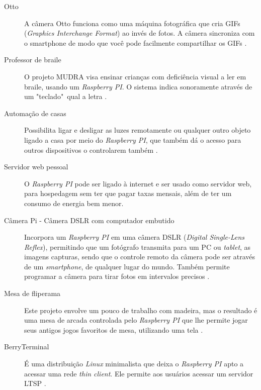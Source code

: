 \documentclass[
	12pt,				%
	openright,			%
	twoside,			%
	a4paper,			%
	chapter=TITLE,		%
	english,			%
	brazil				%
	]{abntex2}
\begin{document}
\begin{description}

\item[Otto]A câmera Otto funciona como uma máquina fotográfica que cria GIFs (\textit{Graphics Interchange Format}) ao invés de fotos. A câmera sincroniza com o smartphone de modo que você pode facilmente compartilhar os GIFs \cite{otto}.
  
\item[Professor de braile] O projeto MUDRA visa ensinar crianças com deficiência visual a ler em braile, usando um \textit{Raspberry PI}. O sistema indica sonoramente através de um "teclado"\ qual a  letra \cite{mudra}.

\item[Automação de casas] Possibilita ligar e desligar as luzes remotamente ou qualquer outro objeto ligado a casa por meio do \textit{Raspberry PI}, que também dá o acesso para outros dispositivos o controlarem também \cite{AplicacaoRaspberry}.

\item[Servidor web pessoal] O \textit{Raspberry PI} pode ser ligado à internet e ser usado como servidor web, para hospedagem sem ter que pagar taxas mensais, além de ter um consumo de energia bem menor.


\item[Câmera Pi - Câmera  DSLR com computador embutido] Incorpora um \textit{Raspberry PI} em uma câmera DSLR (\textit{Digital Single-Lens Reflex}), permitindo que um fotógrafo transmita para um PC ou \textit{tablet}, as imagens capturas, sendo que o controle remoto da câmera pode ser através de um \textit{smartphone}, de qualquer lugar do mundo. Também permite programar a câmera para tirar fotos em intervalos precisos \cite{cameraPI}.

\item[Mesa de fliperama] Este projeto envolve um pouco de trabalho com madeira, mas o resultado é uma mesa de arcada controlada pelo \textit{Raspberry PI} que lhe permite jogar seus antigos jogos favoritos de mesa, utilizando uma tela \cite{AplicacaoRaspberry}.

\item[BerryTerminal] É uma distribuição \textit{Linux} minimalista que deixa o \textit{Raspberry PI} apto a acessar uma rede \textit{thin client}. Ele permite aos usuários acessar um servidor LTSP \cite{berryterminal}.

\end{description}
\end{document}
